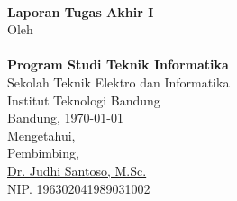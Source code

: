 \clearpage
\pagestyle{empty}

\begin{center}

    \large{\bfseries \MakeUppercase{\thetitle}}
    \\[2\baselineskip]

    \large{\textbf{Laporan Tugas Akhir I}}
    \\[2\baselineskip]

    \normalsize{Oleh\\
    \MakeUppercase{\textbf{\theauthor}}\\
    \textbf{Program Studi Teknik Informatika} \\
    Sekolah Teknik Elektro dan Informatika \\
    Institut Teknologi Bandung}
    \\[4\baselineskip]


    \normalsize{Bandung, \today \\
    Mengetahui, \\[1\baselineskip]
    Pembimbing,\\[4\baselineskip]
    \underline{Dr. Judhi Santoso, M.Sc.}\\
    NIP. 196302041989031002}

\end{center}
\clearpage
